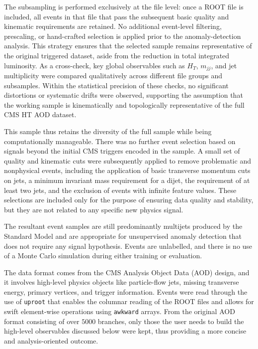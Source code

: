 \documentclass[11pt,a4paper,twocolumn]{article}
\begin{document}
The subsampling is performed exclusively at the file level: once a ROOT file is included, all events in that file that pass the subsequent basic quality and kinematic requirements are retained. No additional event-level filtering, prescaling, or hand-crafted selection is applied prior to the anomaly-detection analysis. This strategy ensures that the selected sample remains representative of the original triggered dataset, aside from the reduction in total integrated luminosity. As a cross-check, key global observables such as $H_T$, $m_{jj}$, and jet multiplicity were compared qualitatively across different file groups and subsamples. Within the statistical precision of these checks, no significant distortions or systematic drifts were observed, supporting the assumption that the working sample is kinematically and topologically representative of the full CMS HT AOD dataset.

This sample thus retains the diversity of the full sample while being computationally manageable. There was no further event selection based on signals beyond the initial CMS triggers encoded in the sample. A small set of quality and kinematic cuts were subsequently applied to remove problematic and nonphysical events, including the application of basic transverse momentum cuts on jets, a minimum invariant mass requirement for a dijet, the requirement of at least two jets, and the exclusion of events with infinite feature values. These selections are included only for the purpose of ensuring data quality and stability, but they are not related to any specific new physics signal.

The resultant event samples are still predominantly multijets produced by the Standard Model and are appropriate for unsupervised anomaly detection that does not require any signal hypothesis. Events are unlabelled, and there is no use of a Monte Carlo simulation during either training or evaluation.

The data format comes from the CMS Analysis Object Data (AOD) design, and it involves high-level physics objects like particle-flow jets, missing transverse energy, primary vertices, and trigger information. Events were read through the use of \texttt{uproot} that enables the columnar reading of the ROOT files and allows for swift element-wise operations using \texttt{awkward} arrays. From the original AOD format consisting of over $5000$ branches, only those the user needs to build the high-level observables discussed below were kept, thus providing a more concise and analysis-oriented outcome.
\end{document}
